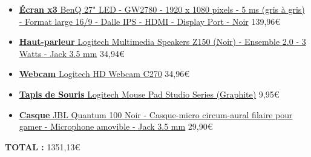 \begin{itemize}
	\item \href{https://www.ldlc.com/fiche/PB00233120.html}{\textbf{Écran x3} BenQ 27" LED - GW2780 - 1920 x 1080 pixels - 5 ms (gris à gris) - Format large 16/9 - Dalle IPS - HDMI - Display Port - Noir} 139,96\euro
	\item \href{https://www.ldlc.com/fiche/PB00154969.html}{\textbf{Haut-parleur} Logitech Multimedia Speakers Z150 (Noir) - Ensemble 2.0 - 3 Watts - Jack 3.5 mm} 34,94\euro
	\item \href{https://www.ldlc.com/fiche/PB00213751.html}{\textbf{Webcam} Logitech HD Webcam C270} 34,96\euro
	\item \href{https://www.ldlc.com/fiche/PB00466685.html}{\textbf{Tapis de Souris} Logitech Mouse Pad Studio Series (Graphite)} 9,95\euro
	\item \href{https://www.ldlc.com/fiche/PB00366138.html}{\textbf{Casque} JBL Quantum 100 Noir - Casque-micro circum-aural filaire pour gamer - Microphone amovible - Jack 3.5 mm} 29,90\euro
\end{itemize}
\vspace{5px}
\textbf{TOTAL :} 1351,13\euro

